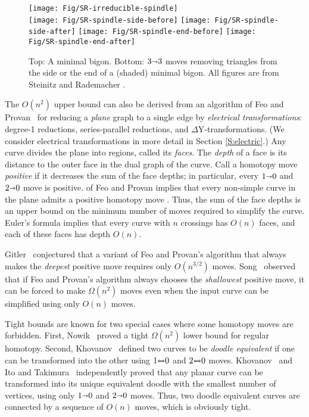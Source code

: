 \documentclass[11pt,twoside]{article}
\def\shortleftrightarrow{{\rlap{$\mathord\shortleftarrow$}\,\mathord\shortrightarrow}}
\def\arcto{\mathord\shortrightarrow}
\def\arc#1#2{#1\arcto#2}
\def\biarc#1#2{#1\mathord\shortleftrightarrow#2}
\def\etal{\emph{et~al.}}			%
\let\EDIT\relax
\numberwithin{figure}{section}
\begin{document}
\begin{figure}[ht]
\centering
\texttt{[image: Fig/SR-irreducible-spindle]} \\
\texttt{[image: Fig/SR-spindle-side-before]} \quad
\texttt{[image: Fig/SR-spindle-side-after]} \qquad
\texttt{[image: Fig/SR-spindle-end-before]} \quad
\texttt{[image: Fig/SR-spindle-end-after]}
\caption{Top: A minimal bigon.  Bottom: $\arc33$ moves removing triangles from the side or the end of a (shaded) minimal bigon.  All figures are from Steinitz and Rademacher \cite{sr-vtp-34}.}
\label{F:SR-spindle}
\end{figure}

The $O(n^2)$ upper bound can also be derived from an algorithm of Feo and Provan~\cite{fp-dtert-93} for reducing a \emph{plane} graph to a single edge by \emph{electrical transformations}: degree-1 reductions, series-parallel reductions, and $\Delta$Y-transformations. (We consider electrical transformations in more detail in Section \ref{S:electric}.) Any curve divides the plane into regions, called its \emph{faces}. The \emph{depth} of a face is its distance to the outer face in the dual graph of the curve. Call a homotopy move \emph{positive} if it decreases the sum of the face depths; in particular, every $\arc10$ and $\arc20$ move is positive.  \EDIT{A key technical lemma} of Feo and Provan implies that every non-simple curve in the plane admits a positive homotopy move \cite[Theorem~1]{fp-dtert-93}. Thus, the sum of the face depths is an upper bound on the minimum number of moves required to simplify the curve. Euler's formula implies that every curve with $n$ crossings has $O(n)$ faces, and each of these faces has depth $O(n)$.

Gitler~\cite{g-dtaa-91} conjectured that a variant of Feo and Provan's algorithm that always makes the \emph{deepest} positive move requires only $O(n^{3/2})$ moves. Song~\cite{s-iifpd-01} observed that if Feo and Provan's algorithm always chooses the \emph{shallowest} positive move, it can be forced to make $\Omega(n^2)$ moves even when the input curve can be simplified using only $O(n)$ moves.

Tight bounds are known for two special cases where some homotopy moves are forbidden. First, Nowik~\cite{n-cpsc-09} proved a tight $\Omega(n^2)$ lower bound for regular homotopy. Second, Khovanov~\cite{k-dg-97} defined two curves to be \emph{doodle equivalent} if one can be transformed into the other using $\biarc10$ and $\biarc20$ moves. Khovanov~\cite{k-dg-97} and Ito and Takimura~\cite{it-whkp-13} independently proved that any planar curve can be transformed into its unique equivalent doodle with the smallest number of vertices, using only $\arc10$ and $\arc20$ moves. Thus, two doodle equivalent curves are connected by a sequence of $O(n)$ moves, which is obviously tight.
\end{document}
